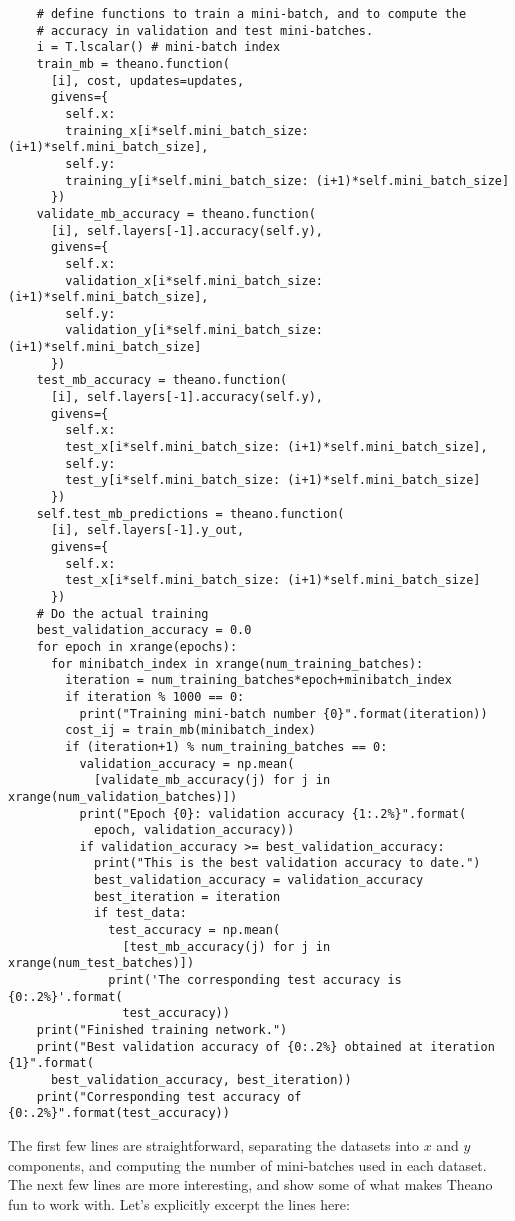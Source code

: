 \documentclass[a4paper,twoside,10pt]{book}
\begin{document}
\begin{lstlisting}
    # define functions to train a mini-batch, and to compute the
    # accuracy in validation and test mini-batches.
    i = T.lscalar() # mini-batch index
    train_mb = theano.function(
      [i], cost, updates=updates,
      givens={
        self.x:
        training_x[i*self.mini_batch_size: (i+1)*self.mini_batch_size],
        self.y:
        training_y[i*self.mini_batch_size: (i+1)*self.mini_batch_size]
      })
    validate_mb_accuracy = theano.function(
      [i], self.layers[-1].accuracy(self.y),
      givens={
        self.x:
        validation_x[i*self.mini_batch_size: (i+1)*self.mini_batch_size],
        self.y:
        validation_y[i*self.mini_batch_size: (i+1)*self.mini_batch_size]
      })
    test_mb_accuracy = theano.function(
      [i], self.layers[-1].accuracy(self.y),
      givens={
        self.x:
        test_x[i*self.mini_batch_size: (i+1)*self.mini_batch_size],
        self.y:
        test_y[i*self.mini_batch_size: (i+1)*self.mini_batch_size]
      })
    self.test_mb_predictions = theano.function(
      [i], self.layers[-1].y_out,
      givens={
        self.x:
        test_x[i*self.mini_batch_size: (i+1)*self.mini_batch_size]
      })
    # Do the actual training
    best_validation_accuracy = 0.0
    for epoch in xrange(epochs):
      for minibatch_index in xrange(num_training_batches):
        iteration = num_training_batches*epoch+minibatch_index
        if iteration % 1000 == 0:
          print("Training mini-batch number {0}".format(iteration))
        cost_ij = train_mb(minibatch_index)
        if (iteration+1) % num_training_batches == 0:
          validation_accuracy = np.mean(
            [validate_mb_accuracy(j) for j in xrange(num_validation_batches)])
          print("Epoch {0}: validation accuracy {1:.2%}".format(
            epoch, validation_accuracy))
          if validation_accuracy >= best_validation_accuracy:
            print("This is the best validation accuracy to date.")
            best_validation_accuracy = validation_accuracy
            best_iteration = iteration
            if test_data:
              test_accuracy = np.mean(
                [test_mb_accuracy(j) for j in xrange(num_test_batches)])
              print('The corresponding test accuracy is {0:.2%}'.format(
                test_accuracy))
    print("Finished training network.")
    print("Best validation accuracy of {0:.2%} obtained at iteration {1}".format(
      best_validation_accuracy, best_iteration))
    print("Corresponding test accuracy of {0:.2%}".format(test_accuracy))
\end{lstlisting}
The first few lines are straightforward, separating the datasets into $x$ and $y$ components, and computing the number of mini-batches used in each dataset. The next few lines are more interesting, and show some of what makes Theano fun to work with. Let's explicitly excerpt the lines here:
\end{document}
